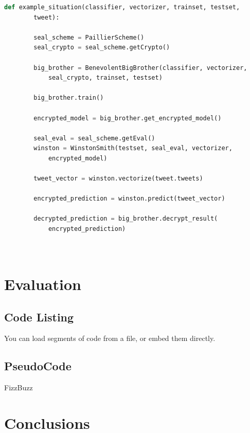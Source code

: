 \documentclass[10pt, a4paper]{article}
\begin{document}
	\begin{lstlisting}[language=Python,caption = Example Exchange]
	def example_situation(classifier, vectorizer, trainset, testset, 
		tweet):
	
		seal_scheme = PaillierScheme()
		seal_crypto = seal_scheme.getCrypto()
		
		big_brother = BenevolentBigBrother(classifier, vectorizer, 
			seal_crypto, trainset, testset)
		
		big_brother.train()
		
		encrypted_model = big_brother.get_encrypted_model()
		
		seal_eval = seal_scheme.getEval()
		winston = WinstonSmith(testset, seal_eval, vectorizer, 
			encrypted_model)
		
		tweet_vector = winston.vectorize(tweet.tweets)
		
		encrypted_prediction = winston.predict(tweet_vector)

		decrypted_prediction = big_brother.decrypt_result(
			encrypted_prediction)
		
	
	\end{lstlisting}
		
	\section{Evaluation}
	
	\subsection{Code Listing}
    You can load segments of code from a file, or embed them directly.
    
    
\subsection{PseudoCode}

\begin{algorithm}[h]
\caption{FizzBuzz}
\end{algorithm}
	
\section{Conclusions}	


\end{document}
